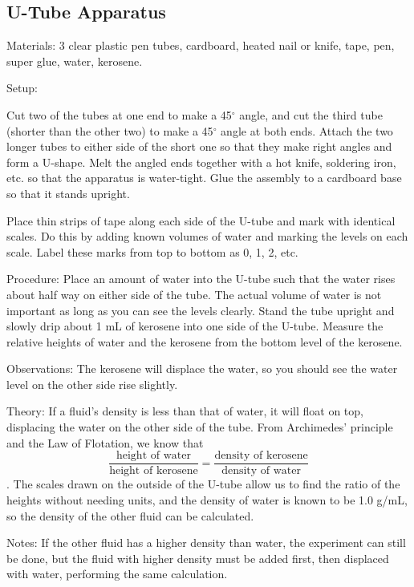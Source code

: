 \begin{multicols}{2}

\subsection{U-Tube Apparatus}
\label{sub:u-tube}

\begin{description*}
\item[Materials:]{3 clear plastic pen tubes, cardboard, heated nail or knife, tape, pen, super glue, water, kerosene.}
\item[Setup:]{Cut two of the tubes at one end to make a 45$^\circ$ angle, and cut the third tube (shorter than the other two) to make a 45$^\circ$ angle at both ends. Attach the two longer tubes to either side of the short one so that they make right angles and form a U-shape. Melt the angled ends together with a hot knife, soldering iron, etc. so that the apparatus is water-tight. Glue the assembly to a cardboard base so that it stands upright. 

Place thin strips of tape along each side of the U-tube and mark with identical scales. Do this by adding known volumes of water and marking the levels on each scale. Label these marks from top to bottom as 0, 1, 2, etc.}
\item[Procedure:]{Place an amount of water into the U-tube such that the water rises about half way on either side of the tube. The actual volume of water is not important as long as you can see the levels clearly. Stand the tube upright and slowly drip about 1 mL of kerosene into one side of the U-tube. Measure the relative heights of water and the kerosene from the bottom level of the kerosene.}
\item[Observations:]{The kerosene will displace the water, so you should see the water level on the other side rise slightly.}
\item[Theory:]{If a fluid’s density is less than that of water, it will float on top, displacing the water on the other side of the tube. From Archimedes’ principle and the Law of Flotation, we know that \[ \frac{\text{height of water}}{\text{height of kerosene}} = \frac{\text{density of kerosene}}{\text{density of water}} \]. The scales drawn on the outside of the U-tube allow us to find the ratio of the heights without needing units, and the density of water is known to be 1.0 g/mL, so the density of the other fluid can be calculated.}
\item[Notes:]{If the other fluid has a higher density than water, the experiment can still be done, but the fluid with higher density must be added first, then displaced with water, performing the same calculation.}
\end{description*}

\end{multicols}

\pagebreak